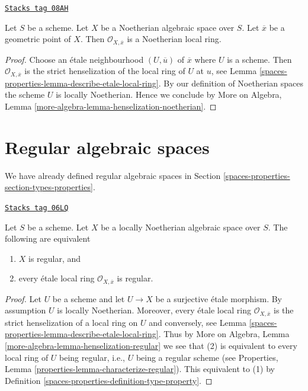 \begin{lemma}
\label{spaces-properties-lemma-Noetherian-local-ring-Noetherian}
\href{https://stacks.math.columbia.edu/tag/08AH}{\texttt{Stacks tag 08AH}}

Let $S$ be a scheme. Let $X$ be a Noetherian algebraic space over $S$.
Let $\overline{x}$ be a geometric point of $X$. Then
$\mathcal{O}_{X, \overline{x}}$ is a Noetherian local ring.
\end{lemma}

\begin{proof}
Choose an \'etale neighbourhood $(U, \overline{u})$ of $\overline{x}$
where $U$ is a scheme. Then $\mathcal{O}_{X, \overline{x}}$ is the
strict henselization of the local ring of $U$ at $u$, see
Lemma \ref{spaces-properties-lemma-describe-etale-local-ring}.
By our definition of Noetherian spaces the scheme $U$ is locally Noetherian.
Hence we conclude by
More on Algebra, Lemma \ref{more-algebra-lemma-henselization-noetherian}.
\end{proof}

\section{Regular algebraic spaces}
\label{spaces-properties-section-regular}
We have already defined regular algebraic spaces in
Section \ref{spaces-properties-section-types-properties}.

\begin{lemma}[Regular]
\label{spaces-properties-lemma-regular}
\href{https://stacks.math.columbia.edu/tag/06LQ}{\texttt{Stacks tag 06LQ}}

Let $S$ be a scheme.
Let $X$ be a locally Noetherian algebraic space over $S$.
The following are equivalent
\begin{enumerate}
\item $X$ is regular, and
\item every \'etale local ring $\mathcal{O}_{X, \overline{x}}$ is
regular.
\end{enumerate}
\end{lemma}

\begin{proof}
Let $U$ be a scheme and let $U \to X$ be a surjective \'etale morphism.
By assumption $U$ is locally Noetherian. Moreover, every \'etale local
ring $\mathcal{O}_{X, \overline{x}}$ is the strict henselization of
a local ring on $U$ and conversely, see
Lemma \ref{spaces-properties-lemma-describe-etale-local-ring}.
Thus by
More on Algebra, Lemma \ref{more-algebra-lemma-henselization-regular}
we see that (2) is equivalent to every local ring of $U$ being
regular, i.e., $U$ being a regular scheme (see
Properties, Lemma \ref{properties-lemma-characterize-regular}).
This equivalent to (1) by
Definition \ref{spaces-properties-definition-type-property}.
\end{proof}

